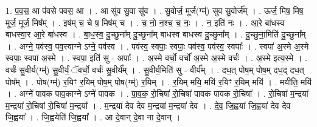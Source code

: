 \documentclass[17pt]{extarticle}
\begin{document}
1. प॒व॒स॒ आ प॑वसे पवस॒ आ । . आ सु॑व सु॒वा सु॑व । . सु॒वोर्ज॒ मूर्ज(ग्म्॑) सुव सु॒वोर्ज᳚म् । . ऊर्ज॒ मिष॒ मिष॒ मूर्ज॒ मूर्ज॒ मिष᳚म् । . इष॑म् च॒ चे ष॒ मिष॑म् च । . च॒ नो॒ न॒श्च॒ च॒ नः॒ । . न॒ इति॑ नः । . आ॒रे बा॑धस्व बाधस्वा॒र आ॒रे बा॑धस्व । . बा॒ध॒स्व॒ दु॒च्छुना᳚म् दु॒च्छुना᳚म् बाधस्व बाधस्व दु॒च्छुना᳚म् । . दु॒च्छुना॒मिति॑ दु॒च्छुना᳚म् । . अग्ने॒ पव॑स्व॒ पव॒स्वाग्ने ऽग्ने॒ पव॑स्व । . पव॑स्व॒ स्वपाः॒ स्वपाः॒ पव॑स्व॒ पव॑स्व॒ स्वपाः᳚ । . स्वपा॑ अ॒स्मे अ॒स्मे स्वपाः॒ स्वपा॑ अ॒स्मे । . स्वपा॒ इति॑ सु - अपाः᳚ । . अ॒स्मे वर्चो॒ वर्चो॑ अ॒स्मे अ॒स्मे वर्चः॑ । . अ॒स्मे इत्य॒स्मे । . वर्चः॑ सु॒वीर्य(ग्म्॑) सु॒वीर्यं॒ ॅवर्चो॒ वर्चः॑ सु॒वीर्य᳚म् । . सु॒वीर्य॒मिति॑ सु - वीर्य᳚म् । . दध॒त् पोष॒म् पोष॒म् दध॒द् दध॒त् पोष᳚म् । . पोष(ग्म्॑) र॒यिꣳ र॒यिम् पोष॒म् पोष(ग्म्॑) र॒यिम् । . र॒यिम् मयि॒ मयि॑ र॒यिꣳ र॒यिम् मयि॑ । . मयीति॒ मयि॑ । . अग्ने॑ पावक पाव॒काग्ने ऽग्ने॑ पावक । . पा॒व॒क॒ रो॒चिषा॑ रो॒चिषा॑ पावक पावक रो॒चिषा᳚ । . रो॒चिषा॑ म॒न्द्रया॑ म॒न्द्रया॑ रो॒चिषा॑ रो॒चिषा॑ म॒न्द्रया᳚ । . म॒न्द्रया॑ देव देव म॒न्द्रया॑ म॒न्द्रया॑ देव । . दे॒व॒ जि॒ह्वया॑ जि॒ह्वया॑ देव देव जि॒ह्वया᳚ । . जि॒ह्वयेति॑ जि॒ह्वया᳚ । . आ दे॒वान् दे॒वा ना दे॒वान् । \newline
\end{document}
